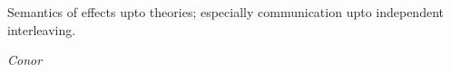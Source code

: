 \documentclass[twocolumn,a4paper,11pt]{article}
\newcommand{\txa}[1]{\textcolor{red}{\textbf{Thorsten:~}#1}}
\begin{document}
Semantics of effects upto theories; especially communication upto
independent interleaving. 

\emph{Conor}












{\small

 
}
\end{document}
